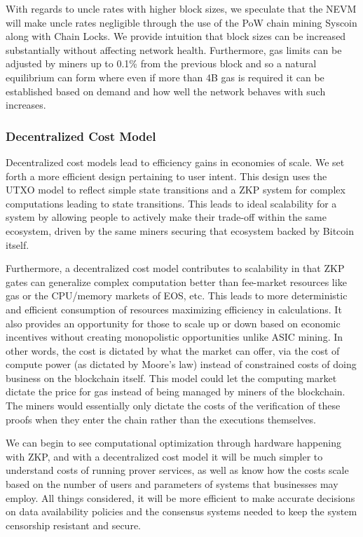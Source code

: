 \documentclass[peerreview]{ieeesyscoin}
\begin{document}
With regards to uncle rates with higher block sizes, we speculate that the NEVM will make uncle rates negligible through the use of the PoW chain mining Syscoin along with Chain Locks. We provide intuition that block sizes can be increased substantially without affecting network health. Furthermore, gas limits can be adjusted by miners up to 0.1\% from the previous block and so a natural equilibrium can form where even if more than 4B gas is required it can be established based on demand and how well the network behaves with such increases. 

\subsubsection{Decentralized Cost Model}

Decentralized cost models lead to efficiency gains in economies of scale. We set forth a more efficient design pertaining to user intent. This design uses the UTXO model to reflect simple state transitions and a ZKP system for complex computations leading to state transitions. This leads to ideal scalability for a system by allowing people to actively make their trade-off within the same ecosystem, driven by the same miners securing that ecosystem backed by Bitcoin itself.

Furthermore, a decentralized cost model contributes to scalability in that ZKP gates can generalize complex computation better than fee-market resources like gas or the CPU/memory markets of EOS, etc. This leads to more deterministic and efficient consumption of resources maximizing efficiency in calculations. It also provides an opportunity for those to scale up or down based on economic incentives without creating monopolistic opportunities unlike ASIC mining. In other words, the cost is dictated by what the market can offer, via the cost of compute power (as dictated by Moore's law) instead of constrained costs of doing business on the blockchain itself. This model could let the computing market dictate the price for gas instead of being managed by miners of the blockchain. The miners would essentially only dictate the costs of the verification of these proofs when they enter the chain rather than the executions themselves.

We can begin to see computational optimization through hardware happening with ZKP, and with a decentralized cost model it will be much simpler to understand costs of running prover services, as well as know how the costs scale based on the number of users and parameters of systems that businesses may employ. All things considered, it will be more efficient to make accurate decisions on data availability policies and the consensus systems needed to keep the system censorship resistant and secure.
\end{document}
